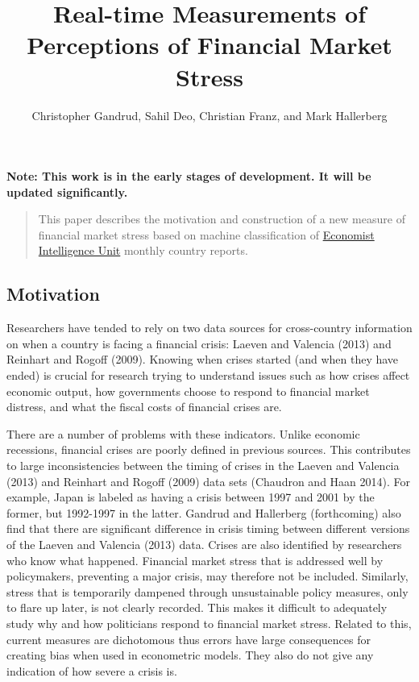 \documentclass[]{article}
\title{Real-time Measurements of Perceptions of Financial Market Stress}
\author{Christopher Gandrud, Sahil Deo, Christian Franz, and Mark Hallerberg}
\date{}
\begin{document}
\maketitle


\textbf{Note: This work is in the early stages of development. It will
be updated significantly.}

\begin{quote}
This paper describes the motivation and construction of a new measure of
financial market stress based on machine classification of
\href{http://www.eiu.com/}{Economist Intelligence Unit} monthly country
reports.
\end{quote}

\subsection{Motivation}\label{motivation}

Researchers have tended to rely on two data sources for cross-country
information on when a country is facing a financial crisis: Laeven and
Valencia (2013) and Reinhart and Rogoff (2009). Knowing when crises
started (and when they have ended) is crucial for research trying to
understand issues such as how crises affect economic output, how
governments choose to respond to financial market distress, and what the
fiscal costs of financial crises are.

There are a number of problems with these indicators. Unlike economic
recessions, financial crises are poorly defined in previous sources.
This contributes to large inconsistencies between the timing of crises
in the Laeven and Valencia (2013) and Reinhart and Rogoff (2009) data
sets (Chaudron and Haan 2014). For example, Japan is labeled as having a
crisis between 1997 and 2001 by the former, but 1992-1997 in the latter.
Gandrud and Hallerberg (forthcoming) also find that there are
significant difference in crisis timing between different versions of
the Laeven and Valencia (2013) data. Crises are also identified by
researchers who know what happened. Financial market stress that is
addressed well by policymakers, preventing a major crisis, may therefore
not be included. Similarly, stress that is temporarily dampened through
unsustainable policy measures, only to flare up later, is not clearly
recorded. This makes it difficult to adequately study why and how
politicians respond to financial market stress. Related to this, current
measures are dichotomous thus errors have large consequences for
creating bias when used in econometric models. They also do not give any
indication of how severe a crisis is.
\end{document}
